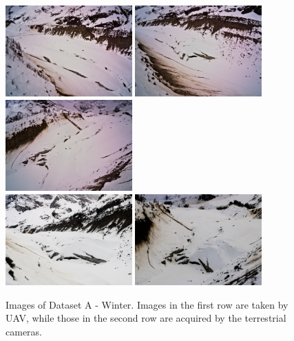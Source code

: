 

\begin{figure}[ht]
  \centering
    \includegraphics[height=3.5cm]{winter_img_1}
    \includegraphics[height=3.5cm]{winter_img_2}
    \includegraphics[height=3.5cm]{winter_img_5} \\ \vspace{1mm}
    \includegraphics[height=3.5cm]{winter_img_3}
    \includegraphics[height=3.5cm]{winter_img_4}
  \caption{Images of Dataset A - Winter. Images in the first row are taken by UAV, while those in the second row are acquired by the terrestrial cameras.}
  \label{fig:5:winter_images}
\end{figure}

